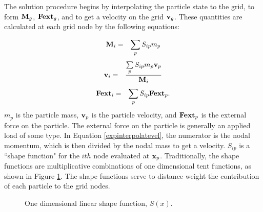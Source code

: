 \documentclass[10pt]{article}
\newcommand{\tn}[1]{\mbox{\bf{#1}}}
\begin{document}
The solution procedure begins by interpolating the particle 
state to the
grid, to form $\tn{M}_g$, $\tn{Fext}_g$, and to get a velocity 
on the grid
$\tn{v}_g$.  These quantities are calculated at each grid
node by the following equations:

\begin{eqnarray}
        \tn{M}_i &=& \sum_{p} S_{ip} m_p  
\label{expinterpolatemass}
\end{eqnarray}
\begin{eqnarray}
        \tn{v}_i &=& \frac{\sum\limits_{p} S_{ip} m_p 
\tn{v}_p}{\tn{M}_i} \label{expinterpolatevel}
\end{eqnarray}
\begin{eqnarray}
        \tn{Fext}_i &=& \sum_{p} S_{ip} \tn{Fext}_p. 
\label{expinterpolateFext}
\end{eqnarray}
$m_p$ is the particle
mass, $\tn{v}_p$ is the particle velocity, and $\tn{Fext}_p$ is 
the external
force on the particle.  The external force on the particle is 
generally an applied load of some type.  In Equation 
\ref{expinterpolatevel}, the numerator is the nodal momentum, 
which is then divided by the nodal mass to get a velocity.  
$S_{ip}$ is a ``shape function" for the $ith$ node
evaluated at $\tn{x}_p$.  Traditionally, the shape functions are 
multiplicative
combinations of one dimensional tent functions, as shown in
Figure \ref{fig-Sip}.  The shape functions serve to distance 
weight the contribution of each particle to the grid nodes.  

\begin{figure}[bh]
  \hspace{1.75in}
  \caption{\label{fig-Sip} One dimensional linear shape function, 
           $S(x)$.}
\end{figure}
\end{document}
